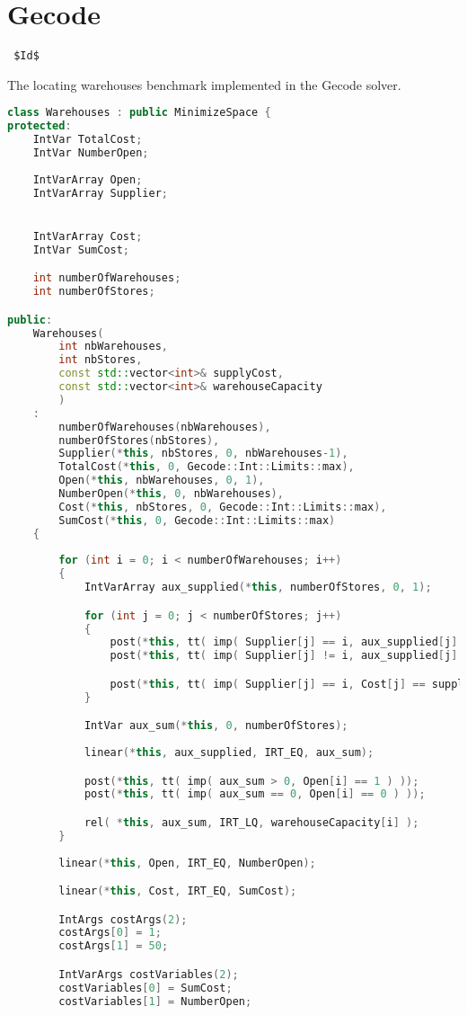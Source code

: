 \section{Gecode}
\verb= $Id$ =

The locating warehouses benchmark implemented in the Gecode solver.

\begin{lstlisting}[language=C++]
class Warehouses : public MinimizeSpace {
protected: 
	IntVar TotalCost;
	IntVar NumberOpen;
	
	IntVarArray Open;
	IntVarArray Supplier;


	IntVarArray Cost;
	IntVar SumCost;

	int numberOfWarehouses;
	int numberOfStores;

public:
	Warehouses(
		int nbWarehouses,
		int nbStores,
		const std::vector<int>& supplyCost, 
		const std::vector<int>& warehouseCapacity
		) 
	: 
		numberOfWarehouses(nbWarehouses),
		numberOfStores(nbStores),
		Supplier(*this, nbStores, 0, nbWarehouses-1),
		TotalCost(*this, 0, Gecode::Int::Limits::max),
		Open(*this, nbWarehouses, 0, 1),
		NumberOpen(*this, 0, nbWarehouses),
		Cost(*this, nbStores, 0, Gecode::Int::Limits::max),
		SumCost(*this, 0, Gecode::Int::Limits::max)
	{
		
		for (int i = 0; i < numberOfWarehouses; i++)
		{
			IntVarArray aux_supplied(*this, numberOfStores, 0, 1);

			for (int j = 0; j < numberOfStores; j++)
			{
				post(*this, tt( imp( Supplier[j] == i, aux_supplied[j] == 1) ));
				post(*this, tt( imp( Supplier[j] != i, aux_supplied[j] == 0) ));

				post(*this, tt( imp( Supplier[j] == i, Cost[j] == supplyCost[i + j * numberOfWarehouses]) ));
			}

			IntVar aux_sum(*this, 0, numberOfStores);
			
			linear(*this, aux_supplied, IRT_EQ, aux_sum);

			post(*this, tt( imp( aux_sum > 0, Open[i] == 1 ) ));
			post(*this, tt( imp( aux_sum == 0, Open[i] == 0 ) ));

			rel( *this, aux_sum, IRT_LQ, warehouseCapacity[i] );
		}
		
		linear(*this, Open, IRT_EQ, NumberOpen);

		linear(*this, Cost, IRT_EQ, SumCost);

		IntArgs costArgs(2);
		costArgs[0] = 1;
		costArgs[1] = 50;

		IntVarArgs costVariables(2);
		costVariables[0] = SumCost;
		costVariables[1] = NumberOpen;


\end{lstlisting}
